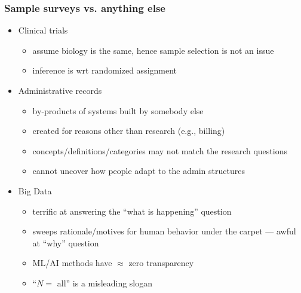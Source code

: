 \documentclass[handout]{beamer}
\begin{document}
\begin{frame}\frametitle{Sample surveys vs. anything else}

\begin{itemize}
    \item Clinical trials
        \begin{itemize}
            \item assume biology is the same, hence sample selection is not an issue
            \item inference is wrt randomized assignment
        \end{itemize}
    \item Administrative records
        \begin{itemize}
            \item by-products of systems built by somebody else
            \item created for reasons other than research (e.g., billing)
            \item concepts/definitions/categories may not match the research questions
            \item cannot uncover how people adapt to the admin structures
        \end{itemize}
    \item Big Data
        \begin{itemize}
            \item terrific at answering the ``what is happening'' question
            \item sweeps rationale/motives for human behavior under the carpet --- awful at ``why'' question
            \item ML/AI methods have $\approx$ zero transparency
            \item ``$N=$ all'' is a misleading slogan
        \end{itemize}
\end{itemize}

\end{frame}
\end{document}
